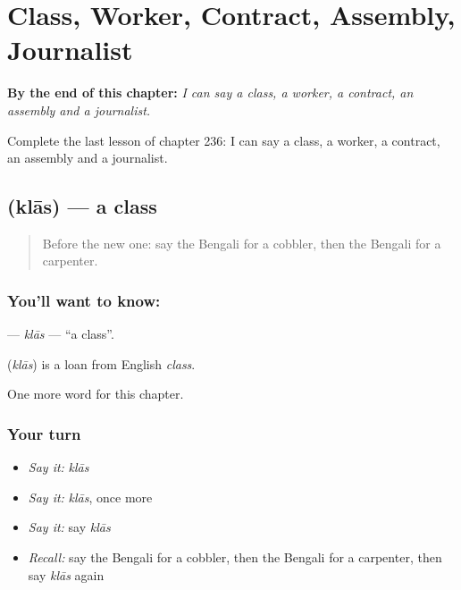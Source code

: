 
\chapter{Class, Worker, Contract, Assembly, Journalist}
\label{ch:bn-class-worker-contract-assembly-journalist}

\begin{chapteropening}
\textbf{By the end of this chapter:} \emph{I can say a class, a worker, a contract, an assembly and a journalist.}

Complete the last lesson of chapter 236: I can say a class, a worker, a contract, an assembly and a journalist.
\end{chapteropening}

\section[\texorpdfstring{\bn{ক্লাস} (klās)}{ক্লাস (klās)}]{ (klās) — a class}

\label{lesson:BN-C236-klas}



\begin{quote}
Before the new one: say the Bengali for a cobbler, then the Bengali for a carpenter.
\end{quote}

\subsection*{You'll want to know: }
\textbf{} — \emph{klās} — \textquotedblleft{}a class\textquotedblright{}.

\begin{cousinweb}
\textbf{} (\emph{klās}) is a loan from English \emph{class}.
\end{cousinweb}

\begin{grammarlens}[title={What you've built}]
One more word for this chapter.
\end{grammarlens}

\subsection*{Your turn}
\begin{itemize}
\raggedright
  \item \emph{Say it:} \emph{klās}
  \item \emph{Say it:} \emph{klās}, once more
  \item \emph{Say it:} say \emph{klās}
  \item \emph{Recall:} say the Bengali for a cobbler, then the Bengali for a carpenter, then say \emph{klās} again
\end{itemize}

